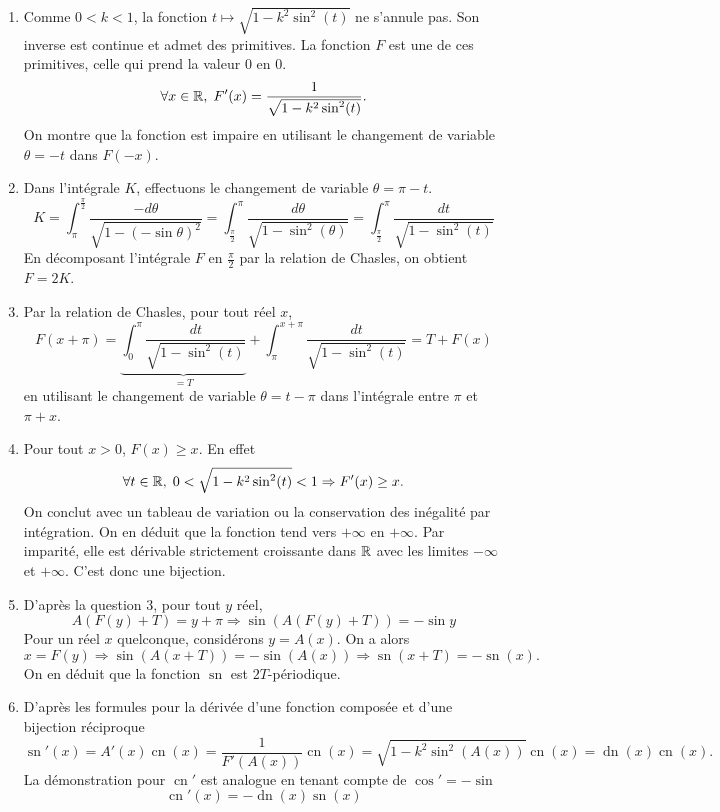 \newcommand{\sn}{\operatorname{sn}}
\newcommand{\cn}{\operatorname{cn}}
\newcommand{\dn}{\operatorname{dn}}

\begin{enumerate}
 \item Comme $0 < k <1$, la fonction $t \mapsto \sqrt{1-k^2 \sin^2(t)}$ ne s'annule pas. Son inverse est continue et admet des primitives. La fonction $F$ est une de ces primitives, celle qui prend la valeur $0$ en $0$.
\[
\forall x\in \mathbb{R}, \;  F'(x) = \frac{1}{\sqrt{1-k^2 \sin^2(t)}}.
\]
On montre que la fonction est impaire en utilisant le changement de variable $\theta = -t$ dans $F(-x)$.

 \item Dans l'intégrale $K$, effectuons le changement de variable $\theta = \pi -t$.
\[
 K = \int_{\pi}^{\frac{\pi}{2}}\frac{-d\theta}{\sqrt{1-(-\sin \theta)^2}} = \int_{\frac{\pi}{2}}^{\pi}\frac{d\theta}{\sqrt{1-\sin^2( \theta)}}
 = \int_{\frac{\pi}{2}}^{\pi}\frac{dt}{\sqrt{1-\sin^2( t)}}
\]
En décomposant l'intégrale $F$ en $\frac{\pi}{2}$ par la relation de Chasles, on obtient $F = 2K$.

 \item Par la relation de Chasles, pour tout réel $x$,
\[
 F(x+\pi) = \underset{= T}{\underbrace{\int_0^{\pi }\frac{dt}{\sqrt{1-\sin^2( t)}}}} + \int_{\pi }^{x+\pi}\frac{dt}{\sqrt{1-\sin^2( t)}}
 = T + F(x)
\]
en utilisant le changement de variable $\theta = t - \pi$ dans l'intégrale entre $\pi$ et $\pi + x$.

 \item Pour tout $x>0$, $F(x)\geq x$. En effet 
\[
 \forall t \in \mathbb{R}, \; 0 < \sqrt{1-k^2 \sin^2(t)}<1 \Rightarrow F'(x) \geq x.
\]
On conclut avec un tableau de variation ou la conservation des inégalité par intégration. On en déduit que la fonction tend vers $+\infty$ en $+\infty$. Par imparité, elle est dérivable strictement croissante dans $\mathbb{R}$ avec les limites $-\infty$ et $+\infty$. C'est donc une bijection.

 \item D'après la question 3, pour tout $y$ réel, 
 \[
  A(F(y) + T) = y + \pi \Rightarrow \sin(A(F(y) + T)) = - \sin y
 \]
Pour un réel $x$ quelconque, considérons $y = A(x)$. On a alors 
\[
x = F(y) \Rightarrow \sin(A(x + T)) = - \sin(A(x)) \Rightarrow \sn(x + T) = -\sn(x). 
\]
On en déduit que la fonction $\sn$ est $2T$-périodique.

 \item D'après les formules pour la dérivée d'une fonction composée et d'une bijection réciproque
\[
 \sn'(x) = A'(x) \cn(x) = \frac{1}{F'(A(x))} \cn(x)
 = \sqrt{1-k^2 \sin^2(A(x))} \cn(x) = \dn(x) \cn(x).
\]
La démonstration pour $\cn'$ est analogue en tenant compte de $\cos' = - \sin$
\[
 \cn'(x) = - \dn(x) \sn(x)
\]


\end{enumerate}
